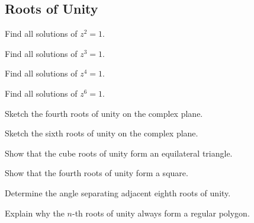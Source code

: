 \subsection*{Roots of Unity}
\begin{exercise}
Find all solutions of $z^2=1$.
\end{exercise}
\begin{exercise}
Find all solutions of $z^3=1$.
\end{exercise}
\begin{exercise}
Find all solutions of $z^4=1$.
\end{exercise}
\begin{exercise}
Find all solutions of $z^6=1$.
\end{exercise}
\begin{exercise}
Sketch the fourth roots of unity on the complex plane.
\end{exercise}
\begin{exercise}
Sketch the sixth roots of unity on the complex plane.
\end{exercise}
\begin{exercise}
Show that the cube roots of unity form an equilateral triangle.
\end{exercise}
\begin{exercise}
Show that the fourth roots of unity form a square.
\end{exercise}
\begin{exercise}
Determine the angle separating adjacent eighth roots of unity.
\end{exercise}
\begin{exercise}
Explain why the $n$-th roots of unity always form a regular polygon.
\end{exercise}

